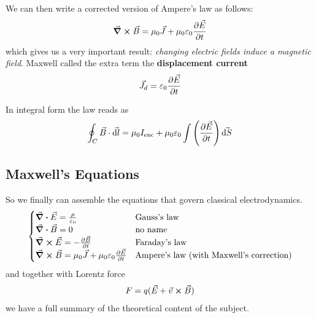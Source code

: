 \documentclass[12pt]{extarticle}
\begin{document}
We can then write a corrected version of Ampere's law as follows:
\begin{equation}
	\curl \vec B = \mu_0 \vec J + \mu_0 \varepsilon_0 \pdv{\vec E}{t}
\end{equation}
which gives us a very important result: \emph{changing electric fields induce a magnetic field}.
Maxwell called the extra term the \textbf{displacement current}
\begin{equation}
	\vec J_d = \varepsilon_0 \pdv{\vec E}{t}
\end{equation}

In integral form the law reads as
\begin{equation}
	\oint_C \vec B \cdot \vec{\dd l} = \mu_0 I_\text{enc} + \mu_0 \varepsilon_0 \int \left( \pdv{\vec E}{t}\right) \vec{\dd S}
\end{equation}


\subsection{Maxwell's Equations}

So we finally can assemble the equations that govern classical electrodynamics.
\begin{equation}
	\begin{cases}
		\div \vec E = \frac{\rho}{\varepsilon_0}                          & \text{Gauss's law}                              \\
		\div \vec B = 0                                                   & \text{no name}                                  \\
		\curl \vec E = -\pdv{\vec B}{t}                                   & \text{Faraday's law}                            \\
		\curl \vec B = \mu_0 \vec J + \mu_0 \varepsilon_0 \pdv{\vec E}{t} & \text{Ampere's law (with Maxwell's correction)}
	\end{cases}
\end{equation}
and together with Lorentz force
\begin{equation}
	F = q(\vec E + \vec v \cross \vec B)
\end{equation}
we have a full summary of the theoretical content of the subject.
\end{document}
